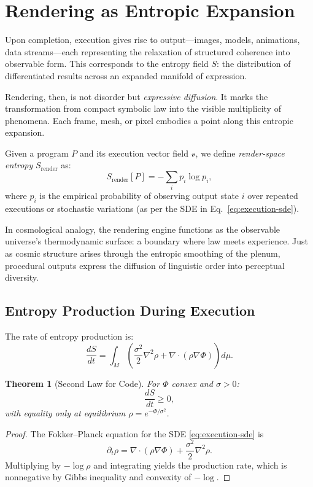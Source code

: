 \documentclass[12pt,a4paper]{article}
\theoremstyle{plain}
\newtheorem{theorem}{Theorem}[section]
\theoremstyle{definition}
\theoremstyle{remark}
\newcommand{\Phifield}{\Phi}
\newcommand{\vfield}{\mathcal{v}}
\newcommand{\Sfield}{S}
\begin{document}
\section{Rendering as Entropic Expansion}
\label{sec:rendering-entropy}

Upon completion, execution gives rise to output—images, models, animations, data streams—each representing the relaxation of structured coherence into observable form. This corresponds to the entropy field $\Sfield$: the distribution of differentiated results across an expanded manifold of expression.

Rendering, then, is not disorder but \emph{expressive diffusion}. It marks the transformation from compact symbolic law into the visible multiplicity of phenomena. Each frame, mesh, or pixel embodies a point along this entropic expansion.

Given a program $P$ and its execution vector field $\vfield$, we define \emph{render-space entropy} $\Sfield_\mathrm{render}$ as:
\begin{equation}
\Sfield_\mathrm{render}[P] = - \sum_{i} p_i \log p_i,
\end{equation}
where $p_i$ is the empirical probability of observing output state $i$ over repeated executions or stochastic variations (as per the SDE in Eq.~\eqref{eq:execution-sde}).

In cosmological analogy, the rendering engine functions as the observable universe’s thermodynamic surface: a boundary where law meets experience. Just as cosmic structure arises through the entropic smoothing of the plenum, procedural outputs express the diffusion of linguistic order into perceptual diversity.

\subsection{Entropy Production During Execution}
The rate of entropy production is:
\[
\frac{d\Sfield}{dt} = \int_M \left( \frac{\sigma^2}{2} \nabla^2 \rho + \nabla \cdot (\rho \nabla \Phifield) \right) d\mu.
\]

\begin{theorem}[Second Law for Code]
For $\Phifield$ convex and $\sigma > 0$:
\[
\frac{d\Sfield}{dt} \geq 0,
\]
with equality only at equilibrium $\rho = e^{-\Phifield/\sigma^2}$.
\end{theorem}

\begin{proof}
The Fokker–Planck equation for the SDE \eqref{eq:execution-sde} is
\[
\partial_t \rho = \nabla \cdot (\rho \nabla \Phifield) + \frac{\sigma^2}{2} \nabla^2 \rho.
\]
Multiplying by $-\log \rho$ and integrating yields the production rate, which is nonnegative by Gibbs inequality and convexity of $-\log$.
\end{proof}
\end{document}
